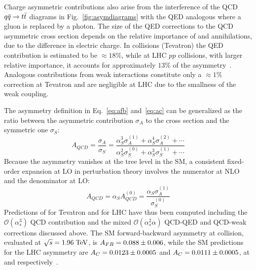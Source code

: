 Charge asymmetric contributions also arise from the interference of
the QCD $q\bar{q}{}\to{}t\bar{t}{}$ diagrams in
Fig.~\ref{fig:asymdiagrams} with the QED analogous where a gluon is
replaced by a photon. The size of the QED corrections to the QCD
asymmetric cross section depends on the relative importance of \uubar{}
and \ddbar{} annihilations, due to the difference in electric charge.
In \ppbar{} collisions (Tevatron) the QED contribution is estimated to
be $\approx{}18\%$, while at LHC $pp$ collisions, with larger relative
\ddbar{} importance, it accounts for approximately $13\%$ of the
asymmetry~\cite{Kuhn:2011ri}.
Analogous contributions from weak interactions constitute only a
$\approx{}1\%$ correction at Tevatron and are negligible at LHC due to
the smallness of the weak coupling.

The asymmetry definition in Eq.~\ref{eq:afb} and~\ref{eq:ac} can be
generalized as the ratio between the asymmetric contribution
$\sigma_A$ to the cross section and the symmetric one $\sigma_S$:
\begin{equation}
  A_{QCD} = \frac{\sigma_A}{\sigma_S} = 
  \frac{\alpha_S^3\sigma_A^{(1)}+\alpha_S^4\sigma_A^{(2)}+\cdots{}}
  {\alpha_S^2\sigma_S^{(0)}+\alpha_S^3\sigma_S^{(1)}+\cdots{}}
\end{equation}
Because the asymmetry vanishes at the tree level in the SM, a
consistent fixed-order expansion at LO in perturbation theory involves the
numerator at NLO and the denominator at LO:
\begin{equation}
  A_{QCD}=\alpha_SA_{QCD}^{(0)}=\frac{\alpha_S\sigma_A^{(1)}}{\sigma_S^{(0)}}
\end{equation}
Predictions of \afb{} for Tevatron and \ac{} for LHC have thus been
computed including the $\mathcal{O}(\alpha_s^3)$
QCD contribution and the mixed $\mathcal{O}(\alpha_s^2\alpha)$ QCD-QED
and QCD-weak corrections discussed above. The SM forward-backward
asymmetry at \ppbar{} collision, evaluated at $\sqrt{s}=1.96\; \mathrm{TeV}{}$,
is $A_{FB}{} = 0.088\pm{}0.006$, while the SM predictions for the LHC
asymmetry are $A_C{}=0.0123\pm{}0.0005$ and $A_C{}=0.0111\pm0.0005$,
at \seventev{} and \eighttev{} respectively~\cite{Bernreuther:2012sx}.
 
